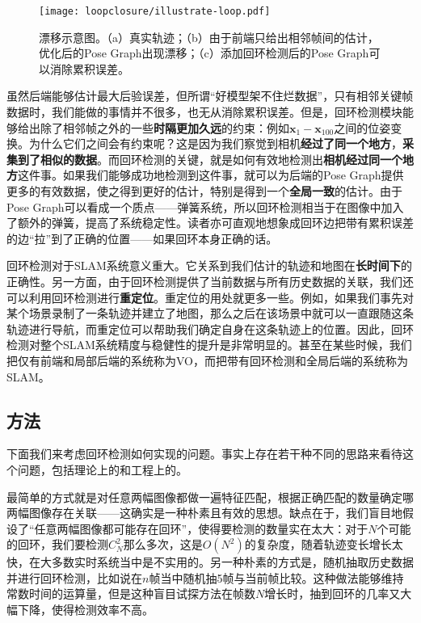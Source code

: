 \begin{figure}[!htp]
	\centering
	\texttt{[image: loopclosure/illustrate-loop.pdf]}
	\caption{漂移示意图。（a）真实轨迹；（b）由于前端只给出相邻帧间的估计，优化后的Pose Graph出现漂移；（c）添加回环检测后的Pose Graph可以消除累积误差。}
	\label{fig:drift}
\end{figure}

虽然后端能够估计最大后验误差，但所谓“好模型架不住烂数据”，只有相邻关键帧数据时，我们能做的事情并不很多，也无从消除累积误差。但是，回环检测模块能够给出除了相邻帧之外的一些\textbf{时隔更加久远}的约束：例如$\bm{x}_1-\bm{x}_{100}$之间的位姿变换。为什么它们之间会有约束呢？这是因为我们察觉到相机\textbf{经过了同一个地方}，\textbf{采集到了相似的数据}。而回环检测的关键，就是如何有效地检测出\textbf{相机经过同一个地方}这件事。如果我们能够成功地检测到这件事，就可以为后端的Pose Graph提供更多的有效数据，使之得到更好的估计，特别是得到一个\textbf{全局一致}的估计。由于Pose Graph可以看成一个质点——弹簧系统，所以回环检测相当于在图像中加入了额外的弹簧，提高了系统稳定性。读者亦可直观地想象成回环边把带有累积误差的边“拉”到了正确的位置——如果回环本身正确的话。

回环检测对于SLAM系统意义重大。它关系到我们估计的轨迹和地图在\textbf{长时间下}的正确性。另一方面，由于回环检测提供了当前数据与所有历史数据的关联，我们还可以利用回环检测进行\textbf{重定位}。重定位的用处就更多一些。例如，如果我们事先对某个场景录制了一条轨迹并建立了地图，那么之后在该场景中就可以一直跟随这条轨迹进行导航，而重定位可以帮助我们确定自身在这条轨迹上的位置。因此，回环检测对整个SLAM系统精度与稳健性的提升是非常明显的。甚至在某些时候，我们把仅有前端和局部后端的系统称为VO，而把带有回环检测和全局后端的系统称为SLAM。

\subsection{方法}
下面我们来考虑回环检测如何实现的问题。事实上存在若干种不同的思路来看待这个问题，包括理论上的和工程上的。

最简单的方式就是对任意两幅图像都做一遍特征匹配，根据正确匹配的数量确定哪两幅图像存在关联——这确实是一种朴素且有效的思想。缺点在于，我们盲目地假设了“任意两幅图像都可能存在回环”，使得要检测的数量实在太大：对于$N$个可能的回环，我们要检测$C_N^2$那么多次，这是$O(N^2)$的复杂度，随着轨迹变长增长太快，在大多数实时系统当中是不实用的。另一种朴素的方式是，随机抽取历史数据并进行回环检测，比如说在$n$帧当中随机抽5帧与当前帧比较。这种做法能够维持常数时间的运算量，但是这种盲目试探方法在帧数$N$增长时，抽到回环的几率又大幅下降，使得检测效率不高。

